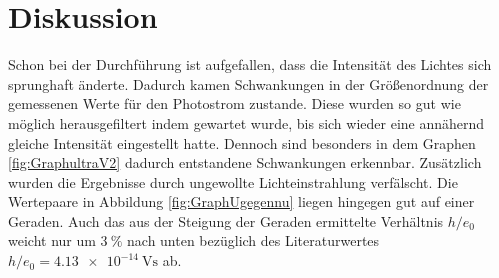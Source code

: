 
\section{Diskussion}
\label{sec:Diskussion}

Schon bei der Durchführung ist aufgefallen, dass die Intensität des Lichtes sich sprunghaft änderte. Dadurch kamen Schwankungen in der Größenordnung der gemessenen Werte für den Photostrom zustande. Diese wurden so gut wie möglich herausgefiltert indem gewartet wurde, bis sich wieder eine annähernd gleiche Intensität eingestellt hatte. Dennoch sind besonders in dem Graphen \ref{fig:GraphultraV2} dadurch entstandene Schwankungen erkennbar. Zusätzlich wurden die Ergebnisse durch ungewollte Lichteinstrahlung verfälscht. Die Wertepaare in Abbildung \ref{fig:GraphUgegennu} liegen hingegen gut auf einer Geraden. Auch das aus der Steigung der Geraden ermittelte Verhältnis $h/e_0$ weicht nur um $\SI{3}{\percent}$ nach unten bezüglich des Literaturwertes $h/e_0=\SI{4.13e-14}{\volt\second}$ \cite{nistgov} ab.
